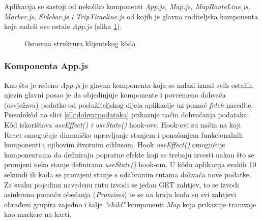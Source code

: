 \documentclass[zavrsnirad]{fer}
\begin{document}
Aplikacija se sastoji od nekoliko komponenti \textit{App.js, Map.js, MapRouteLine.js, Marker.js, Sidebar.js i TripTimeline.js} od kojih je glavna roditeljska komponenta koja sadrži sve ostale \textit{App.js} (slika \ref{slk:strukturaklijent}).

\begin{figure}[H]
	\caption{Osnovna struktura klijentskog kôda}
	\label{slk:strukturaklijent}
\end{figure}

\subsubsection{Komponenta App.js}
Kao što je rečeno \textit{App.js} je glavna komponenta koja se nalazi iznad svih ostalih, njezin glavni posao je da objedinjuje komponente i povremeno dohvaća (osvježava) podatke od poslužiteljskog dijela aplikacije uz pomoć \textit{fetch} naredbe. Pseudok\^od na slici \ref{slk:dohvatpodataka} prikazuje način dohvaćanja podataka.\\ K\^od iskorištava \textit{useEffect() i useState()} hook-ove. Hook-ovi su način na koji React omogućuje dinamičko upravljanje stanjem i ponašanjem funkcionalnih komponenti i njihovim životnim ciklusom. Hook \textit{useEffect()} omogućuje komponentama da definiraju popratne efekte koji se trebaju izvesti nakon što se promjeni neko stanje definirano \textit{useState()} hook-om. U k\^odu aplikacija svakih 10 sekundi ili kada se promjeni stanje s odabranim rutama dohvaća nove podatke. Za svaku pojedinu navedenu rutu izvodi se jedan GET zahtjev, to se izvodi asinkrono pomoću obećanja (\textit{Promises}) te se na kraju kada su svi zahtjevi obrađeni grupira zajedno i šalje \textit{"child"} komponenti \textit{Map} koja prikazuje tramvaje kao markere na karti.
\end{document}
